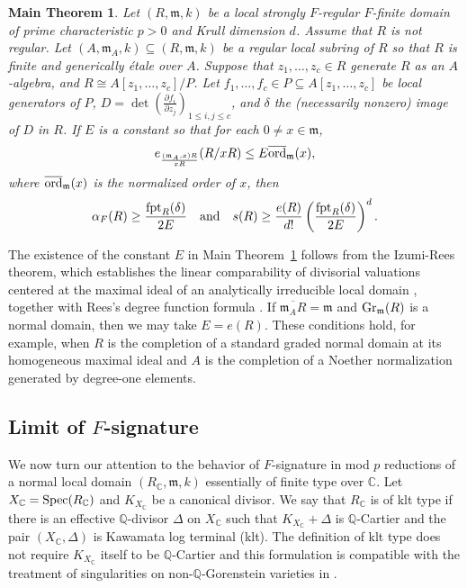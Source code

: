 \documentclass[12pt]{amsart}
\numberwithin{equation}{theorem}
\theoremstyle{plain}
\newtheorem{maintheorem}{Main Theorem}
\newcommand{\fm}{\mathfrak{m}}
\newcommand{\QQ}{\mathbb{Q}}
\newcommand{\CC}{\mathbb{C}}
\begin{document}
\begin{maintheorem}
    \label{main theorem: F-sig lowerbound via fpt of single element}
    Let $(R,\fm,k)$ be a local strongly $F$-regular $F$-finite domain of prime characteristic $p>0$ and Krull dimension $d$. Assume that $R$ is not regular. Let $(A,\fm_A,k)\subseteq (R,\fm,k)$ be a regular local subring of $R$ so that $R$ is finite and generically \'{e}tale over $A$. Suppose that $z_1,\ldots,z_c\in R$ generate $R$ as an $A$-algebra, and $R\cong A[z_1,\ldots,z_c]/P$. Let $f_1,\ldots,f_c\in P\subseteq A[z_1,\ldots,z_c]$ be local generators of $P$, $D = \det(\frac{\partial f_i}{\partial z_j})_{1\leq i,j\leq c}$, and $\delta$ the (necessarily nonzero) image of $D$ in $R$. If $E$ is a constant so that for each $0\not=x\in \fm$, 
        \[
        e_{\frac{(\fm_A,x)R}{xR}}(R/xR)\leq E\overline{\ord}_{\fm}(x),
        \]
        where $\overline{\ord}_{\fm}(x)$ is the normalized order of $x$, then
        \[
        \alpha_F(R)\geq \frac{\operatorname{{fpt}}_R(\delta)}{2E}\quad\mbox{and}\quad s(R) \geq \frac{e(R)}{d!}\left(\frac{\operatorname{{fpt}}_R(\delta)}{2E}\right)^d.
        \]
\end{maintheorem}

\begin{remark}
    The existence of the constant $E$ in Main Theorem~\ref{main theorem: F-sig lowerbound via fpt of single element} follows from the Izumi-Rees theorem, which establishes the linear comparability of divisorial valuations centered at the maximal ideal of an analytically irreducible local domain \cite{Rees1989}, together with Rees's degree function formula \cite{Rees1961}. If $\overline{\fm_A R}=\fm$ and $\Gr_{\fm}(R)$ is a normal domain, then we may take $E=e(R)$. These conditions hold, for example, when $R$ is the completion of a standard graded normal domain at its homogeneous maximal ideal and $A$ is the completion of a Noether normalization generated by degree-one elements.
\end{remark}

\subsection{Limit of $F$-signature}

We now turn our attention to the behavior of $F$-signature in mod $p$ reductions of a normal local domain $(R_{\CC},\fm,k)$ essentially of finite type over $\CC$. Let $X_{\CC}=\Spec(R_{\CC})$ and $K_{X_{\CC}}$ be a canonical divisor. We say that $R_{\CC}$ is of klt type if there is an effective $\QQ$-divisor $\Delta$ on $X_{\CC}$ such that $K_{X_{\CC}}+\Delta$ is $\QQ$-Cartier and the pair $(X_{\CC},\Delta)$ is Kawamata log terminal (klt). The definition of klt type does not require $K_{X_{\CC}}$ itself to be $\QQ$-Cartier and this formulation is compatible with the treatment of singularities on non-$\mathbb{Q}$-Gorenstein varieties in \cite{deFernexHacon2009}.
\end{document}
